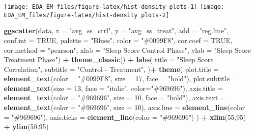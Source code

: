 \documentclass[
]{article}
\newenvironment{Shaded}{\begin{snugshade}}{\end{snugshade}}
\newcommand{\AttributeTok}[1]{\textcolor[rgb]{0.13,0.29,0.53}{#1}}
\newcommand{\ConstantTok}[1]{\textcolor[rgb]{0.56,0.35,0.01}{#1}}
\newcommand{\DecValTok}[1]{\textcolor[rgb]{0.00,0.00,0.81}{#1}}
\newcommand{\FunctionTok}[1]{\textcolor[rgb]{0.13,0.29,0.53}{\textbf{#1}}}
\newcommand{\NormalTok}[1]{#1}
\newcommand{\SpecialCharTok}[1]{\textcolor[rgb]{0.81,0.36,0.00}{\textbf{#1}}}
\newcommand{\StringTok}[1]{\textcolor[rgb]{0.31,0.60,0.02}{#1}}
\begin{document}
\texttt{[image: EDA\_EM\_files/figure-latex/hist-density plots-1]}
\texttt{[image: EDA\_EM\_files/figure-latex/hist-density plots-2]}

\begin{Shaded}
\begin{Highlighting}[]
\FunctionTok{ggscatter}\NormalTok{(data, }\AttributeTok{x =} \StringTok{"avg\_ss\_ctrl"}\NormalTok{, }\AttributeTok{y =} \StringTok{"avg\_ss\_treat"}\NormalTok{,}
          \AttributeTok{add =} \StringTok{"reg.line"}\NormalTok{, }\AttributeTok{conf.int =} \ConstantTok{TRUE}\NormalTok{,}
          \AttributeTok{palette =} \StringTok{"Blues"}\NormalTok{, }\AttributeTok{color =} \StringTok{"\#0099F8"}\NormalTok{,}
          \AttributeTok{cor.coef =} \ConstantTok{TRUE}\NormalTok{, }\AttributeTok{cor.method =} \StringTok{"pearson"}\NormalTok{,}
          \AttributeTok{xlab =} \StringTok{"Sleep Score Control Phase"}\NormalTok{, }
          \AttributeTok{ylab =} \StringTok{"Sleep Score Treatment Phase"}\NormalTok{) }\SpecialCharTok{+}
  \FunctionTok{theme\_classic}\NormalTok{() }\SpecialCharTok{+}
  \FunctionTok{labs}\NormalTok{(}
    \AttributeTok{title =} \StringTok{"Sleep Score Correlation"}\NormalTok{,}
    \AttributeTok{subtitle =} \StringTok{"Control {-} Treatment"}\NormalTok{,}
\NormalTok{  )}\SpecialCharTok{+}
  \FunctionTok{theme}\NormalTok{(}
    \AttributeTok{plot.title =} \FunctionTok{element\_text}\NormalTok{(}\AttributeTok{color =} \StringTok{"\#0099F8"}\NormalTok{,}
                              \AttributeTok{size =} \DecValTok{17}\NormalTok{,}
                              \AttributeTok{face =} \StringTok{"bold"}\NormalTok{),}
    \AttributeTok{plot.subtitle =} \FunctionTok{element\_text}\NormalTok{(}\AttributeTok{size =} \DecValTok{13}\NormalTok{, }
                                 \AttributeTok{face =} \StringTok{"italic"}\NormalTok{,}
                                 \AttributeTok{color=}\StringTok{"\#969696"}\NormalTok{),}
    \AttributeTok{axis.title =} \FunctionTok{element\_text}\NormalTok{(}\AttributeTok{color =} \StringTok{"\#969696"}\NormalTok{,}
                              \AttributeTok{size =} \DecValTok{10}\NormalTok{,}
                              \AttributeTok{face =} \StringTok{"bold"}\NormalTok{),}
    \AttributeTok{axis.text =} \FunctionTok{element\_text}\NormalTok{(}\AttributeTok{color =} \StringTok{"\#969696"}\NormalTok{, }\AttributeTok{size =} \DecValTok{10}\NormalTok{),}
    \AttributeTok{axis.line =} \FunctionTok{element\_line}\NormalTok{(}\AttributeTok{color =} \StringTok{"\#969696"}\NormalTok{),}
    \AttributeTok{axis.ticks =} \FunctionTok{element\_line}\NormalTok{(}\AttributeTok{color =} \StringTok{"\#969696"}\NormalTok{)}
\NormalTok{  ) }\SpecialCharTok{+} 
  \FunctionTok{xlim}\NormalTok{(}\DecValTok{55}\NormalTok{,}\DecValTok{95}\NormalTok{) }\SpecialCharTok{+}
  \FunctionTok{ylim}\NormalTok{(}\DecValTok{50}\NormalTok{,}\DecValTok{95}\NormalTok{)}
\end{Highlighting}
\end{Shaded}
\end{document}
